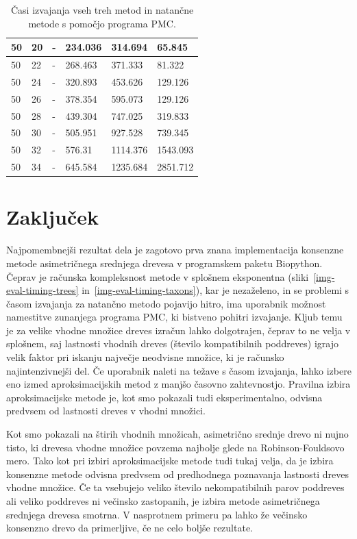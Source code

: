 \documentclass[a4paper, 12pt]{book}
\begin{document}
\begin{table}[h!]
\begin{center}
{\begin{tabular}{ l| l | l | l | l | l }
	50             & 20         & -           & 234.036   & 314.694   & 65.845      \\ \hline
	50             & 22         & -           & 268.463   & 371.333   & 81.322      \\ \hline
	50             & 24         & -           & 320.893   & 453.626   & 129.126     \\ \hline
	50             & 26         & -           & 378.354   & 595.073   & 129.126     \\ \hline
	50             & 28         & -           & 439.304   & 747.025   & 319.833     \\ \hline
	50             & 30         & -           & 505.951   & 927.528   & 739.345     \\ \hline
	50             & 32         & -           & 576.31    & 1114.376  & 1543.093    \\ \hline
	50             & 34         & -           & 645.584   & 1235.684  & 2851.712    \\ \hline
	\end{tabular}
	\label{table-eval-timing}
	\caption{
	 Časi izvajanja vseh treh metod in natančne metode s pomočjo programa PMC.
	 }
	}
	\end{center}		
\end{table}

\chapter{Zaključek}
Najpomembnejši rezultat dela je zagotovo prva znana implementacija konsenzne metode
asimetričnega srednjega drevesa v programskem paketu Biopython. Čeprav je računska 
kompleksnost metode v splošnem eksponentna (sliki~\ref{img-eval-timing-trees} 
in~\ref{img-eval-timing-taxons}), kar je nezaželeno, in se problemi s
časom izvajanja za natančno metodo pojavijo hitro, ima uporabnik možnost namestitve 
zunanjega programa PMC, ki bistveno pohitri izvajanje. Kljub temu je za velike vhodne 
množice dreves izračun lahko dolgotrajen, čeprav to ne velja v splošnem,
saj lastnosti vhodnih dreves (število kompatibilnih poddreves) igrajo velik faktor pri
iskanju največje neodvisne množice, ki je računsko najintenzivnejši del. Če 
uporabnik naleti na težave s časom izvajanja, lahko izbere eno izmed 
aproksimacijskih metod z manjšo časovno zahtevnostjo. Pravilna izbira 
aproksimacijske metode je, kot smo pokazali tudi eksperimentalno, odvisna 
predvsem od lastnosti dreves v vhodni množici. 

Kot smo pokazali na štirih vhodnih množicah, asimetrično srednje drevo ni nujno 
tisto, ki drevesa vhodne množice povzema 
najbolje glede na Robinson-Fouldsovo mero. Tako kot pri izbiri aproksimacijske metode tudi tukaj velja, da 
je izbira konsenzne metode odvisna predvsem od predhodnega poznavanja lastnosti 
dreves vhodne množice. Če ta vsebujejo veliko število nekompatibilnih parov 
poddreves ali veliko poddreves ni večinsko zastopanih, je izbira metode 
asimetričnega srednjega drevesa smotrna. V nasprotnem primeru pa lahko že 
večinsko konsenzno drevo da primerljive, če ne celo boljše rezultate.
\end{document}
